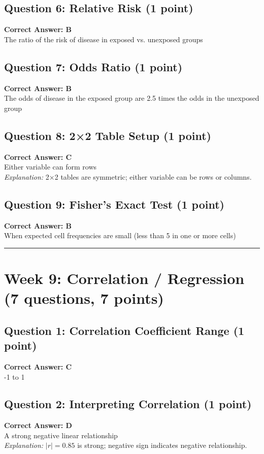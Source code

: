 \documentclass[10pt]{article}
\begin{document}
\subsection*{Question 6: Relative Risk (1 point)}
\textbf{Correct Answer: \textcolor{correctcolor}{B}}\\
The ratio of the risk of disease in exposed vs. unexposed groups

\subsection*{Question 7: Odds Ratio (1 point)}
\textbf{Correct Answer: \textcolor{correctcolor}{B}}\\
The odds of disease in the exposed group are 2.5 times the odds in the unexposed group

\subsection*{Question 8: 2×2 Table Setup (1 point)}
\textbf{Correct Answer: \textcolor{correctcolor}{C}}\\
Either variable can form rows\\
\textit{Explanation:} 2×2 tables are symmetric; either variable can be rows or columns.

\subsection*{Question 9: Fisher's Exact Test (1 point)}
\textbf{Correct Answer: \textcolor{correctcolor}{B}}\\
When expected cell frequencies are small (less than 5 in one or more cells)

\vspace{10pt}

\noindent\rule{\textwidth}{0.4pt}

\section*{Week 9: Correlation / Regression (7 questions, 7 points)}

\subsection*{Question 1: Correlation Coefficient Range (1 point)}
\textbf{Correct Answer: \textcolor{correctcolor}{C}}\\
-1 to 1

\subsection*{Question 2: Interpreting Correlation (1 point)}
\textbf{Correct Answer: \textcolor{correctcolor}{D}}\\
A strong negative linear relationship\\
\textit{Explanation:} $|r| = 0.85$ is strong; negative sign indicates negative relationship.
\end{document}
